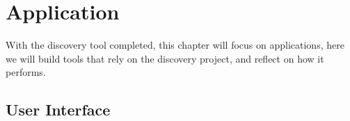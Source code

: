 \chapter{Application}\label{ch:application}
With the discovery tool completed, this chapter will focus on applications, here we will build tools that rely on the
discovery project, and reflect on how it performs.

\section{User Interface}\label{sec:user-interface}
